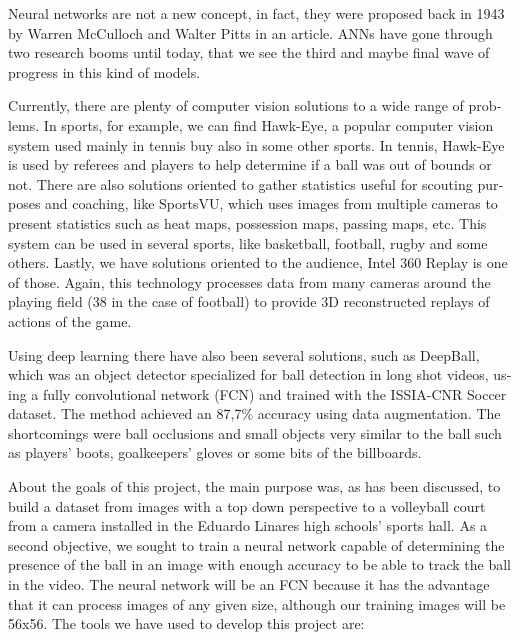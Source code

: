 \begin{otherlanguage}{english}
Neural networks are not a new concept, in fact, they were proposed back in 1943 by Warren McCulloch and Walter Pitts in an article. ANNs have gone through two research booms until today, that we see the third and maybe final wave of progress in this kind of models.

Currently, there are plenty of computer vision solutions to a wide range of problems. In sports, for example, we can find Hawk-Eye, a popular computer vision system used mainly in tennis buy also in some other sports. In tennis, Hawk-Eye is used by referees and players to help determine if a ball was out of bounds or not. There are also solutions oriented to gather statistics useful for scouting purposes and coaching, like SportsVU, which uses images from multiple cameras to present statistics such as heat maps, possession maps, passing maps, etc. This system can be used in several sports, like basketball, football, rugby and some others. Lastly, we have solutions oriented to the audience, Intel 360 Replay is one of those. Again, this technology processes data from many cameras around the playing field (38 in the case of football) to provide 3D reconstructed replays of actions of the game.

Using deep learning there have also been several solutions, such as DeepBall, which was an object detector specialized for ball detection in long shot videos, using a fully convolutional network (FCN) and trained with the ISSIA-CNR Soccer dataset. The method achieved an 87,7\% accuracy using data augmentation. The shortcomings were ball occlusions and small objects very similar to the ball such as players’ boots, goalkeepers’ gloves or some bits of the billboards.

About the goals of this project, the main purpose was, as has been discussed, to build a dataset from images with a top down perspective to a volleyball court from a camera installed in the Eduardo Linares high schools’ sports hall. As a second objective, we sought to train a neural network capable of determining the presence of the ball in an image with enough accuracy to be able to track the ball in the video. The neural network will be an FCN because it has the advantage that it can process images of any given size, although our training images will be 56x56.
The tools we have used to develop this project are: 


\end{otherlanguage}

